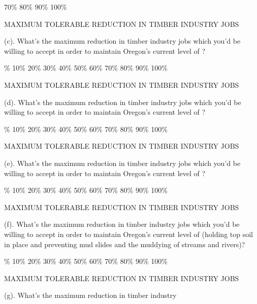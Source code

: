 70\% \hfill 80\% \hfill 90\% \hfill 100\%
\medskip\par\noindent
\centerline{MAXIMUM TOLERABLE REDUCTION IN TIMBER INDUSTRY JOBS}
\bigskip\bigskip\par\noindent
{(c).} What's the maximum reduction in timber industry 
jobs which you'd be willing to accept in order to maintain Oregon's current
level of ?
\medskip\par{}\% \hfill 10\% \hfill 20\% \hfill 30\% \hfill 40\% \hfill 50\% \hfill 60\% \hfill 
70\% \hfill 80\% \hfill 90\% \hfill 100\%
\medskip\par\noindent
\centerline{MAXIMUM TOLERABLE REDUCTION IN TIMBER INDUSTRY JOBS}
\bigskip\bigskip\par\noindent
{(d).} What's the maximum reduction in timber industry 
jobs which you'd be willing to accept in order to maintain Oregon's current
level of ?
\medskip\par{}\% \hfill 10\% \hfill 20\% \hfill 30\% \hfill 40\% \hfill 50\% \hfill 60\% \hfill 
70\% \hfill 80\% \hfill 90\% \hfill 100\%
\medskip\par\noindent
\centerline{MAXIMUM TOLERABLE REDUCTION IN TIMBER INDUSTRY JOBS}
\bigskip\bigskip\par\noindent
{(e).} What's the maximum reduction in timber industry 
jobs which you'd be willing to accept in order to maintain Oregon's current
level of ?
\medskip\par{}\% \hfill 10\% \hfill 20\% \hfill 30\% \hfill 40\% \hfill 50\% \hfill 60\% \hfill 
70\% \hfill 80\% \hfill 90\% \hfill 100\%
\medskip\par\noindent
\centerline{MAXIMUM TOLERABLE REDUCTION IN TIMBER INDUSTRY JOBS}
\bigskip\bigskip\par\noindent
{(f).} What's the maximum reduction in timber industry 
jobs which you'd be willing to accept in order to maintain Oregon's current
level of  (holding top soil in place and preventing
mud slides and the muddying of streams and rivers)?
\medskip\par{}\% \hfill 10\% \hfill 20\% \hfill 30\% \hfill 40\% \hfill 50\% \hfill 60\% \hfill 
70\% \hfill 80\% \hfill 90\% \hfill 100\%
\medskip\par\noindent
\centerline{MAXIMUM TOLERABLE REDUCTION IN TIMBER INDUSTRY JOBS}
\bigskip\bigskip\par\noindent
{(g).} What's the maximum reduction in timber industry 
